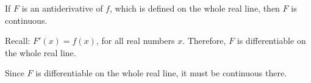 \documentclass{ximera}
\author{Steven Gubkin\and Nela Lakos}
\begin{document}
\begin{exercise}

If $F$ is an antiderivative of $f$, which is defined on the whole real line, then $F$ is continuous.
\begin{hint}
Recall: $F'(x)=f(x)$, for all real numbers $x$. Therefore, $F$ is differentiable on the whole real line.
\end{hint}
\begin{hint}
Since  $F$ is differentiable on the whole real line, it  must be continuous there.
\end{hint}
	\begin{multipleChoice}	
	\end{multipleChoice}

\end{exercise}
\end{document}
